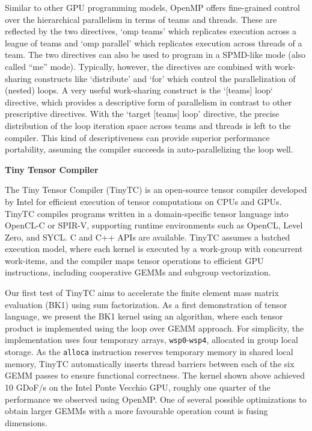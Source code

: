 \documentclass[a4paper,12pt, numbers]{article}
\begin{document}
Similar to other GPU programming models, OpenMP offers fine-grained control over the hierarchical parallelism in terms of teams and threads. These are reflected by the two directives, `omp teams' which replicates execution across a league of teams and `omp parallel' which replicates execution across threads of a team.  The two directives can also be used to program in a SPMD-like mode (also called ``me'' mode). Typically, however, the directives are combined with work-sharing constructs like `distribute' and `for' which control the parallelization of (nested) loops. A very useful work-sharing construct is the `[teams] loop` directive, which provides  a descriptive form of parallelism in contrast to other prescriptive directives. With the `target [teams] loop' directive, the precise distribution of the loop iteration space across teams and threads is left to the compiler. This kind of descriptiveness can provide superior performance portability, assuming the compiler succeeds in auto-parallelizing the loop well.

\noindent\textbf{Tiny Tensor Compiler}

The Tiny Tensor Compiler (TinyTC) is an open-source tensor compiler developed by Intel for efficient execution of tensor computations on CPUs and GPUs. TinyTC compiles programs written in a domain-specific tensor language into OpenCL-C or SPIR-V, supporting runtime environments such as OpenCL, Level Zero, and SYCL. C and C++ APIs are available. TinyTC assumes a batched execution model, where each kernel is executed by a work-group with concurrent work-items, and the compiler maps tensor operations to efficient GPU instructions, including cooperative GEMMs and subgroup vectorization.

Our first test of TinyTC aims to accelerate the finite element mass matrix evaluation (BK1) using sum factorization. As a first demonstration of tensor language, we present the BK1 kernel using an algorithm, where each tensor product is implemented using the loop over GEMM approach. For simplicity, the implementation uses four temporary arrays, \texttt{wsp0}-\texttt{wsp4}, allocated in group local storage. As the \texttt{alloca} instruction reserves temporary memory in shared local memory, TinyTC automatically inserts thread barriers between each of the six GEMM passes to ensure functional correctness. The kernel shown above achieved 10 GDoF/s on the Intel Ponte Vecchio GPU, roughly one quarter of the performance we observed using OpenMP. One of several possible optimizations to obtain larger GEMMs with a more favourable operation count is fusing dimensions.
\end{document}
